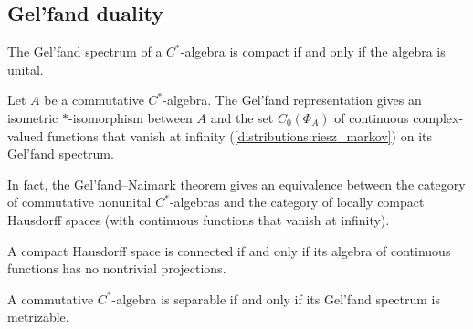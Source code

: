\subsection{Gel'fand duality}

    \begin{property}
        The Gel'fand spectrum of a $C^*$-algebra is compact if and only if the algebra is unital.
    \end{property}


    \begin{theorem}
        Let $A$ be a commutative $C^*$-algebra. The Gel'fand representation gives an isometric $\ast$-isomorphism between $A$ and the set $C_0(\Phi_A)$ of continuous complex-valued functions that vanish at infinity (\cref{distributions:riesz_markov}) on its Gel'fand spectrum.
    \end{theorem}
    \begin{remark}
        In fact, the Gel'fand--Naimark theorem gives an equivalence between the category of commutative nonunital $C^*$-algebras and the category of locally compact Hausdorff spaces (with continuous functions that vanish at infinity).
    \end{remark}

    \begin{property}[Connectedness]
        A compact Hausdorff space is connected if and only if its algebra of continuous functions has no nontrivial projections.
    \end{property}
    \begin{property}[Metrizability]
        A commutative $C^*$-algebra is separable if and only if its Gel'fand spectrum is metrizable.
    \end{property}

